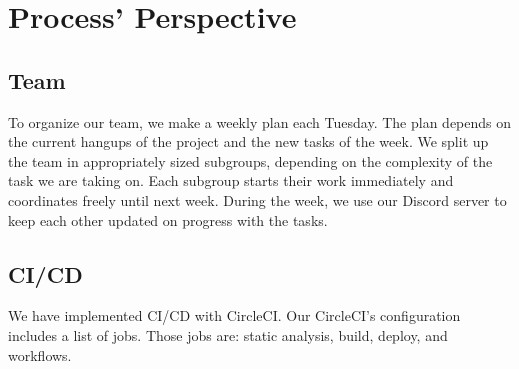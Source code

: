 \section{Process' Perspective}

\subsection{Team}
To organize our team, we make a weekly plan each Tuesday. The plan depends on the current hangups of the project and the new tasks of the week. \newline
We split up the team in appropriately sized subgroups, depending on the complexity of the task we are taking on.
Each subgroup starts their work immediately and coordinates freely until next week. During the week, we use our Discord server to keep each other updated on progress with the tasks.


\subsection{CI/CD}

We have implemented CI/CD with CircleCI. Our CircleCI's configuration includes a list of jobs. Those jobs are: static analysis, build, deploy, and workflows.

